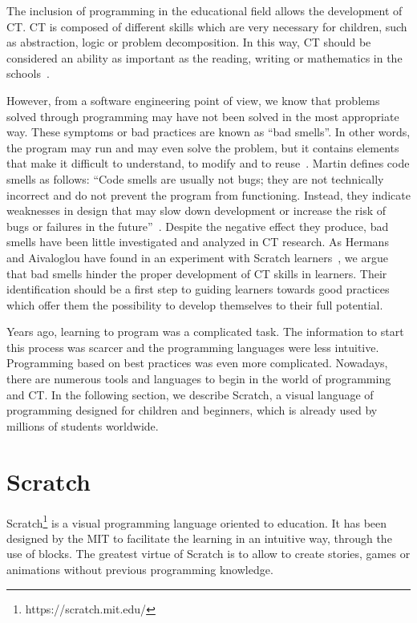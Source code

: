 The inclusion of programming in the educational field allows the development of CT. CT is composed of different skills which are very necessary for children, such as abstraction, logic or problem decomposition. In this way, CT should be considered an ability as important as the reading, writing or mathematics in the schools~\cite{calao:_design}.

However, from a software engineering point of view, we know that problems solved through programming may have not been solved in the most appropriate way. These symptoms or bad practices are known as ``bad smells''. In other words, the program may run and may even solve the problem, but it contains elements that make it difficult to understand, to modify and to reuse~\cite{zhang:_badsmells}. Martin defines code smells as follows: ``Code smells are usually not bugs; they are not technically incorrect and do not prevent the program from functioning. Instead, they indicate weaknesses in design that may slow down development or increase the risk of bugs or failures in the future''~\cite{martin:_clean}. Despite the negative effect they produce, bad smells have been little investigated and analyzed in CT research. As Hermans and Aivaloglou have found in an experiment with Scratch learners~\cite{felienne:_hamper}, we argue that bad smells hinder the proper development of CT skills in learners. Their identification should be a first step to guiding learners towards good practices which offer them the possibility to develop themselves to their full potential.

Years ago, learning to program was a complicated task. The information to start this process was scarcer and the programming languages were less intuitive. Programming based on best practices was even more complicated. Nowadays, there are numerous tools and languages to begin in the world of programming and CT. In the following section, we describe Scratch, a visual language of programming designed for children and beginners, which is already used by millions of students worldwide.


\section{Scratch}
\label{sec:scratch}

Scratch\footnote{https://scratch.mit.edu/} is a visual programming language oriented to education. It has been designed by the MIT to facilitate the learning in an intuitive way, through the use of blocks. The greatest virtue of Scratch is to allow to create stories, games or animations without previous programming knowledge.

